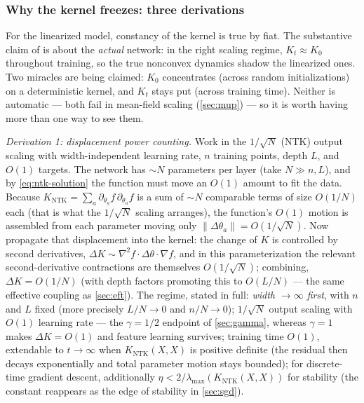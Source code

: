 \documentclass[11pt]{article}
\newcommand{\ntk}{K_{\mathrm{NTK}}}
\begin{document}
\subsubsection{Why the kernel freezes: three derivations}
\label{sec:ntk-freeze}

For the linearized model, constancy of the kernel is true by fiat. The
substantive claim of \cite{jacot2018neural} is about the \emph{actual}
network: in the right scaling regime, $K_t \approx K_0$ throughout
training, so the true nonconvex dynamics shadow the linearized ones. Two
miracles are being claimed: $K_0$ concentrates (across random
initializations) on a deterministic kernel, and $K_t$ stays put (across
training time). Neither is automatic --- both fail in mean-field scaling
(\cref{sec:mup}) --- so it is worth having more than one way to see them.

\emph{Derivation 1: displacement power counting.} Work in the
$1/\sqrt{N}$ (NTK) output scaling with width-independent learning rate,
$n$ training points, depth $L$, and $O(1)$ targets. The network has
$\sim N$ parameters per layer (take $N \gg n, L$), and by
\cref{eq:ntk-solution} the function must move an $O(1)$ amount to fit the
data. Because $\ntk = \sum_a \partial_{\theta_a} f\,
\partial_{\theta_a} f$ is a sum of $\sim N$ comparable terms of size
$O(1/N)$ each (that is what the $1/\sqrt N$ scaling arranges), the
function's $O(1)$ motion is assembled from each parameter moving only
$\|\Delta\theta_a\| = O(1/\sqrt{N})$. Now propagate that displacement
into the kernel: the change of $K$ is controlled by second derivatives,
$\Delta K \sim \nabla^2 f \cdot \Delta\theta \cdot \nabla f$, and in this
parameterization the relevant second-derivative contractions are
themselves $O(1/\sqrt N)$; combining, $\Delta K = O(1/N)$ (with depth
factors promoting this to $O(L/N)$ --- the same effective coupling as
\cref{sec:eft}). The regime, stated in full: \emph{width $\to \infty$
first}, with $n$ and $L$ fixed (more precisely $L/N \to 0$ and
$n/N \to 0$); $1/\sqrt N$ output scaling with $O(1)$ learning rate ---
the $\gamma = 1/2$ endpoint of \cref{sec:gamma}, whereas $\gamma = 1$
makes $\Delta K = O(1)$ and feature learning survives; training time
$O(1)$, extendable to $t \to \infty$ when $\ntk(X,X)$ is positive
definite (the residual then decays exponentially and total parameter
motion stays bounded); for discrete-time gradient descent, additionally
$\eta < 2/\lambda_{\max}(\ntk(X,X))$ for stability (the constant
reappears as the edge of stability in \cref{sec:sgd}).
\end{document}
